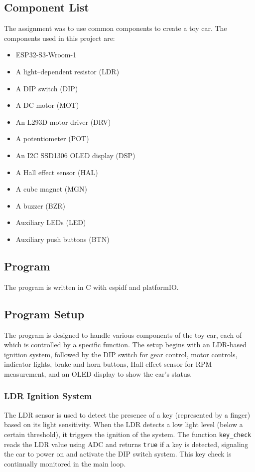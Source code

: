 \subsection{Component List}
The assignment was to use common components to create a toy car. The components used in this project are:
\begin{itemize}
    \item ESP32-S3-Wroom-1
    \item A light–dependent resistor (LDR)
    \item A DIP switch (DIP)
    \item A DC motor (MOT)
    \item An L293D motor driver (DRV)
    \item A potentiometer (POT)
    \item An I2C SSD1306 OLED display (DSP)
    \item A Hall effect sensor (HAL)
    \item A cube magnet (MGN)
    \item A buzzer (BZR)
    \item Auxiliary LEDs (LED)
    \item Auxiliary push buttons (BTN)
\end{itemize}

\subsection{Program}
The program is written in C with espidf and platformIO.

\subsection{Program Setup}
The program is designed to handle various components of the toy car, each of which is controlled by a specific function. The setup begins with an LDR-based ignition system, followed by the DIP switch for gear control, motor controls, indicator lights, brake and horn buttons, Hall effect sensor for RPM measurement, and an OLED display to show the car's status.

\subsubsection{LDR Ignition System}
The LDR sensor is used to detect the presence of a key (represented by a finger) based on its light sensitivity. When the LDR detects a low light level (below a certain threshold), it triggers the ignition of the system. The function \texttt{key\_check} reads the LDR value using ADC and returns \texttt{true} if a key is detected, signaling the car to power on and activate the DIP switch system. This key check is continually monitored in the main loop.

